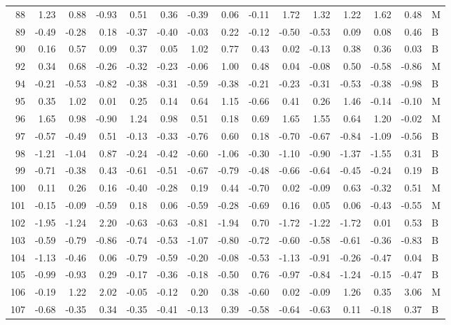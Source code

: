 \begin{table}[ht]
\begin{tabular}{rrrrrrrrrrrrrrl}
  88 & 1.23 & 0.88 & -0.93 & 0.51 & 0.36 & -0.39 & 0.06 & -0.11 & 1.72 & 1.32 & 1.22 & 1.62 & 0.48 & M \\ 
  89 & -0.49 & -0.28 & 0.18 & -0.37 & -0.40 & -0.03 & 0.22 & -0.12 & -0.50 & -0.53 & 0.09 & 0.08 & 0.46 & B \\ 
  90 & 0.16 & 0.57 & 0.09 & 0.37 & 0.05 & 1.02 & 0.77 & 0.43 & 0.02 & -0.13 & 0.38 & 0.36 & 0.03 & B \\ 
  92 & 0.34 & 0.68 & -0.26 & -0.32 & -0.23 & -0.06 & 1.00 & 0.48 & 0.04 & -0.08 & 0.50 & -0.58 & -0.86 & M \\ 
  94 & -0.21 & -0.53 & -0.82 & -0.38 & -0.31 & -0.59 & -0.38 & -0.21 & -0.23 & -0.31 & -0.53 & -0.38 & -0.98 & B \\ 
  95 & 0.35 & 1.02 & 0.01 & 0.25 & 0.14 & 0.64 & 1.15 & -0.66 & 0.41 & 0.26 & 1.46 & -0.14 & -0.10 & M \\ 
  96 & 1.65 & 0.98 & -0.90 & 1.24 & 0.98 & 0.51 & 0.18 & 0.69 & 1.65 & 1.55 & 0.64 & 1.20 & -0.02 & M \\ 
  97 & -0.57 & -0.49 & 0.51 & -0.13 & -0.33 & -0.76 & 0.60 & 0.18 & -0.70 & -0.67 & -0.84 & -1.09 & -0.56 & B \\ 
  98 & -1.21 & -1.04 & 0.87 & -0.24 & -0.42 & -0.60 & -1.06 & -0.30 & -1.10 & -0.90 & -1.37 & -1.55 & 0.31 & B \\ 
  99 & -0.71 & -0.38 & 0.43 & -0.61 & -0.51 & -0.67 & -0.79 & -0.48 & -0.66 & -0.64 & -0.45 & -0.24 & 0.19 & B \\ 
  100 & 0.11 & 0.26 & 0.16 & -0.40 & -0.28 & 0.19 & 0.44 & -0.70 & 0.02 & -0.09 & 0.63 & -0.32 & 0.51 & M \\ 
  101 & -0.15 & -0.09 & -0.59 & 0.18 & 0.06 & -0.59 & -0.28 & -0.69 & 0.16 & 0.05 & 0.06 & -0.43 & -0.55 & M \\ 
  102 & -1.95 & -1.24 & 2.20 & -0.63 & -0.63 & -0.81 & -1.94 & 0.70 & -1.72 & -1.22 & -1.72 & 0.01 & 0.53 & B \\ 
  103 & -0.59 & -0.79 & -0.86 & -0.74 & -0.53 & -1.07 & -0.80 & -0.72 & -0.60 & -0.58 & -0.61 & -0.36 & -0.83 & B \\ 
  104 & -1.13 & -0.46 & 0.06 & -0.79 & -0.59 & -0.20 & -0.08 & -0.53 & -1.13 & -0.91 & -0.26 & -0.47 & 0.04 & B \\ 
  105 & -0.99 & -0.93 & 0.29 & -0.17 & -0.36 & -0.18 & -0.50 & 0.76 & -0.97 & -0.84 & -1.24 & -0.15 & -0.47 & B \\ 
  106 & -0.19 & 1.22 & 2.02 & -0.05 & -0.12 & 0.20 & 0.38 & -0.60 & 0.02 & -0.09 & 1.26 & 0.35 & 3.06 & M \\ 
  107 & -0.68 & -0.35 & 0.34 & -0.35 & -0.41 & -0.13 & 0.39 & -0.58 & -0.64 & -0.63 & 0.11 & -0.18 & 0.37 & B \\ 

\end{tabular}
\end{table}
